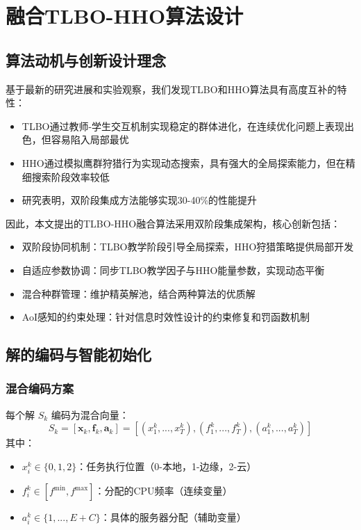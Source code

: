 \documentclass[conference]{IEEEtran}
\begin{document}
\section{融合TLBO-HHO算法设计}
\subsection{算法动机与创新设计理念}
基于最新的研究进展和实验观察，我们发现TLBO和HHO算法具有高度互补的特性：
\begin{itemize}
    \item TLBO通过教师-学生交互机制实现稳定的群体进化，在连续优化问题上表现出色，但容易陷入局部最优
    \item HHO通过模拟鹰群狩猎行为实现动态搜索，具有强大的全局探索能力，但在精细搜索阶段效率较低
    \item 研究表明，双阶段集成方法能够实现30-40\%的性能提升
\end{itemize}

因此，本文提出的TLBO-HHO融合算法采用双阶段集成架构，核心创新包括：
\begin{itemize}
    \item 双阶段协同机制：TLBO教学阶段引导全局探索，HHO狩猎策略提供局部开发
    \item 自适应参数协调：同步TLBO教学因子与HHO能量参数，实现动态平衡
    \item 混合种群管理：维护精英解池，结合两种算法的优质解
    \item AoI感知的约束处理：针对信息时效性设计的约束修复和罚函数机制
\end{itemize}

\subsection{解的编码与智能初始化}
\subsubsection{混合编码方案}
每个解 $S_k$ 编码为混合向量：
\begin{equation}
S_k = [\mathbf{x}_k, \mathbf{f}_k, \mathbf{a}_k] = [(x_1^k, ..., x_T^k), (f_1^k, ..., f_T^k), (a_1^k, ..., a_T^k)]
\end{equation}
其中：
\begin{itemize}
    \item $x_i^k \in \{0, 1, 2\}$：任务执行位置（0-本地，1-边缘，2-云）
    \item $f_i^k \in [f^{\min}, f^{\max}]$：分配的CPU频率（连续变量）
    \item $a_i^k \in \{1, ..., E+C\}$：具体的服务器分配（辅助变量）
\end{itemize}
\end{document}
